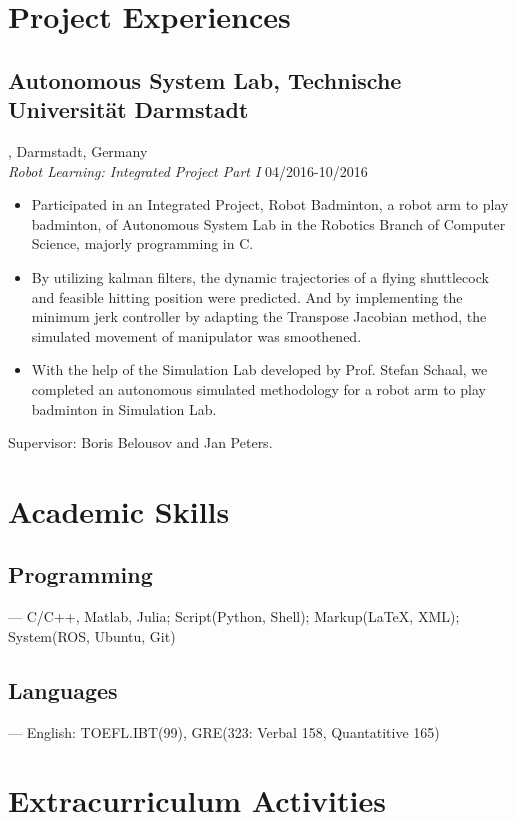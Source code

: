 \documentclass{article}
\begin{document}
\section{Project Experiences}
\subsection{Autonomous System Lab, Technische Universit\"at Darmstadt}, Darmstadt, Germany\\
\emph{Robot Learning: Integrated Project Part I }\hfill 04/2016-10/2016
\begin{itemize}[noitemsep,topsep=1pt]
\item Participated in an Integrated Project, Robot Badminton, a robot arm to play badminton, of Autonomous System Lab in the Robotics Branch of Computer Science, majorly programming in  C.
\item By utilizing kalman filters, the dynamic trajectories of a flying shuttlecock and feasible hitting position were predicted. And by implementing the minimum jerk controller by adapting the Transpose Jacobian method, the simulated movement of manipulator was smoothened.
\item With the help of the Simulation Lab developed by Prof. Stefan Schaal, we completed an autonomous simulated methodology for a robot arm to play badminton in Simulation Lab.
\end{itemize}
Supervisor: Boris Belousov and Jan Peters.

\section{Academic Skills}
\subsection{Programming}
--- C/C++, Matlab, Julia; Script(Python, Shell); Markup({\LaTeX}, XML); System(ROS, Ubuntu, Git)
\subsection{Languages}
--- English: TOEFL.IBT(99), GRE(323: Verbal 158, Quantatitive 165)

\section{Extracurriculum Activities}
\end{document}
